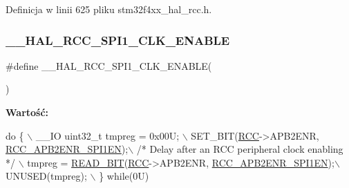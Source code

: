 Definicja w linii 625 pliku stm32f4xx\+\_\+hal\+\_\+rcc.\+h.

\mbox{\label{group___r_c_c___a_p_b2___clock___enable___disable_ga856c7460aa481976644736c703c6702d}} 
\subsubsection{\texorpdfstring{\+\_\+\+\_\+\+H\+A\+L\+\_\+\+R\+C\+C\+\_\+\+S\+P\+I1\+\_\+\+C\+L\+K\+\_\+\+E\+N\+A\+B\+LE}{\_\_HAL\_RCC\_SPI1\_CLK\_ENABLE}}
{\footnotesize\ttfamily \#define \+\_\+\+\_\+\+H\+A\+L\+\_\+\+R\+C\+C\+\_\+\+S\+P\+I1\+\_\+\+C\+L\+K\+\_\+\+E\+N\+A\+B\+LE(\begin{DoxyParamCaption}{ }\end{DoxyParamCaption})}

{\bfseries Wartość\+:}
\begin{DoxyCode}
\textcolor{keywordflow}{do} \{ \(\backslash\)
                                        \_\_IO uint32\_t tmpreg = 0x00U; \(\backslash\)
                                        SET\_BIT(\hyperlink{group___peripheral__declaration_ga74944438a086975793d26ae48d5882d4}{RCC}->APB2ENR, 
      \hyperlink{group___peripheral___registers___bits___definition_gae08a3510371b9234eb96369c91d3552f}{RCC\_APB2ENR\_SPI1EN});\(\backslash\)
                                        \textcolor{comment}{/* Delay after an RCC peripheral clock enabling */} \(\backslash\)
                                        tmpreg = \hyperlink{group___exported__macro_ga822bb1bb9710d5f2fa6396b84e583c33}{READ\_BIT}(\hyperlink{group___peripheral__declaration_ga74944438a086975793d26ae48d5882d4}{RCC}->APB2ENR, 
      \hyperlink{group___peripheral___registers___bits___definition_gae08a3510371b9234eb96369c91d3552f}{RCC\_APB2ENR\_SPI1EN});\(\backslash\)
                                        UNUSED(tmpreg); \(\backslash\)
                                          \} \textcolor{keywordflow}{while}(0U)
\end{DoxyCode}


